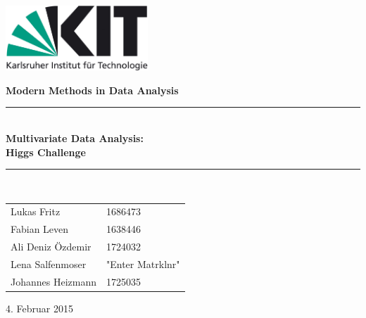 \documentclass[11pt,a4paper]{scrartcl}
\newcommand{\Versuchsname}{Multivariate Data Analysis: \\ Higgs Challenge}			%
\newcommand{\Datum}{4. Februar 2015}			%
\begin{document}
\newcommand{\bra}[1]{\ensuremath{\left( #1 \right)}}
\newcommand{\abs}[1]{\ensuremath{\left| #1 \right|}}
\newcommand{\diff}[2]{\ensuremath{\frac{\partial #1}{\partial #2}}}

\newcommand{\HRule}{\rule{\linewidth}{0.5mm}}
\newcommand{\E}[1]{\textrm{#1}}
\begin{titlepage}
	\begin{flushright}
		\includegraphics[width=0.4\textwidth]{kit_logo_de_farbe_positiv.jpg}\\[1cm]
	\end{flushright}
	\vspace{2cm}
	\begin{center}
	{\huge \textbf{Modern Methods in Data Analysis}}
	\vspace{1cm}

\HRule \\[0.4cm]
{ \huge \bfseries \Versuchsname}\\[0.2cm]
\HRule \\[0.5cm]

\begin{flushleft}
	\begin{minipage}{0.4\textwidth}
	\large
		\begin{tabular}{l l}
			Lukas Fritz & 1686473 \\
			Fabian Leven & 1638446\\
			Ali Deniz Özdemir & 1724032\\
			Lena Salfenmoser & "Enter Matrklnr"\\
			Johannes Heizmann & 1725035 \\
		\end{tabular}
	\end{minipage}
\end{flushleft}
\vfill

{\large \Datum}
\end{center}

\end{titlepage}
\tableofcontents
\newpage










%
%
%
\end{document}
